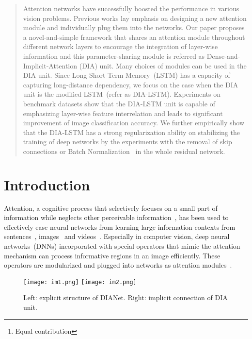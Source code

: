 \documentclass[letterpaper]{article} \usepackage{aaai20}  \usepackage{times}  \usepackage{helvet} \usepackage{courier}  \usepackage[hyphens]{url}  \usepackage{graphicx} \urlstyle{rm} \def\UrlFont{\rm}  \usepackage{graphicx}  \frenchspacing  \setlength{\pdfpagewidth}{8.5in}  \setlength{\pdfpageheight}{11in}  \usepackage{color}
\author{Zhongzhan Huang\textsuperscript{\rm 1}\thanks{Equal contribution},
Senwei Liang\textsuperscript{\rm 2$*$}, Mingfu Liang\textsuperscript{\rm 3},
Haizhao Yang\textsuperscript{\rm 2,4}\\
\textsuperscript{\rm 1}{New Oriental AI Research Academy}\\
\textsuperscript{\rm 2}{National University of Singapore} \\
\textsuperscript{\rm 3}{Northwestern University}\\
\textsuperscript{\rm 4}{Purdue University}\\
hzz\_dedekinds@foxmail.com,\quad
liangsenwei@u.nus.edu,\\
mingfuliang2020@u.northwestern.edu,\quad
matyh@nus.edu.sg}
\begin{document}
\maketitle

\begin{abstract}
Attention networks have successfully boosted the performance in various vision problems.  Previous works lay emphasis on designing a new attention module and individually plug them into the networks. Our paper proposes a novel-and-simple framework that shares an attention module throughout different network layers to encourage the integration of layer-wise information and this parameter-sharing module is referred as Dense-and-Implicit-Attention (DIA) unit. Many choices of modules can be used in the DIA unit. Since Long Short Term Memory~(LSTM) has a capacity of capturing long-distance dependency, we focus on the case when the DIA unit is the modified LSTM~(refer as DIA-LSTM). Experiments on benchmark datasets show that the DIA-LSTM unit is capable of emphasizing layer-wise feature interrelation and leads to significant improvement of image classification accuracy. We further empirically show that the DIA-LSTM has a strong regularization ability on stabilizing the training of deep networks by the experiments with the removal of skip connections or Batch Normalization~\cite{Ioffe:2015:BNA:3045118.3045167} in the whole residual network. 
\end{abstract}

\section{Introduction}
	Attention, a cognitive process that selectively focuses on a small part of information while neglects other perceivable information~\cite{anderson2005cognitive}, has been used to effectively ease neural networks from learning large information contexts from sentences~\cite{vaswani2017attention,britz2017massive,cheng2016long}, images~\cite{Xu:2015:SAT:3045118.3045336,luong2015effective} and videos~\cite{miech2017learnable}. Especially in computer vision, deep neural networks~(DNNs) incorporated with special operators that mimic the attention mechanism can process informative regions in an image efficiently. These operators are modularized and plugged into networks as attention modules~\cite{hu2018squeeze,woo2018cbam,park2018bam,wang2018non,hu2018gather,cao2019GCNet}.
	\begin{figure}[htbp]
		\centering
		\texttt{[image: im1.png]}
		\hspace{.1in}
		\texttt{[image: im2.png]}
		\caption{Left: explicit structure of DIANet. Right: implicit connection of DIA unit.}
		\label{imp}
	\end{figure}
	
\end{document}
